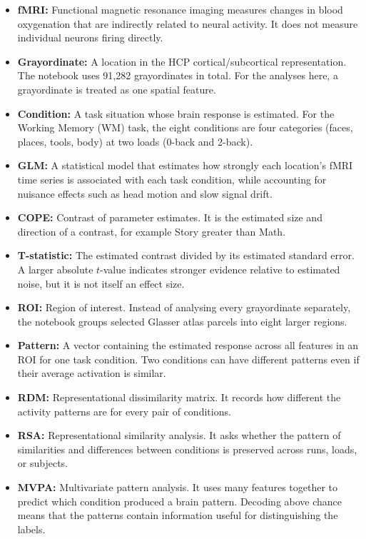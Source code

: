 \documentclass[11pt,a4paper]{article}
\begin{document}
\begin{itemize}
    \item \textbf{fMRI:} Functional magnetic resonance imaging measures changes in blood oxygenation that are indirectly related to neural activity. It does not measure individual neurons firing directly.
    \item \textbf{Grayordinate:} A location in the HCP cortical/subcortical representation. The notebook uses 91,282 grayordinates in total. For the analyses here, a grayordinate is treated as one spatial feature.
    \item \textbf{Condition:} A task situation whose brain response is estimated. For the Working Memory (WM) task, the eight conditions are four categories (faces, places, tools, body) at two loads (0-back and 2-back).
    \item \textbf{GLM:} A statistical model that estimates how strongly each location's fMRI time series is associated with each task condition, while accounting for nuisance effects such as head motion and slow signal drift.
    \item \textbf{COPE:} Contrast of parameter estimates. It is the estimated size and direction of a contrast, for example Story greater than Math.
    \item \textbf{T-statistic:} The estimated contrast divided by its estimated standard error. A larger absolute \(t\)-value indicates stronger evidence relative to estimated noise, but it is not itself an effect size.
    \item \textbf{ROI:} Region of interest. Instead of analysing every grayordinate separately, the notebook groups selected Glasser atlas parcels into eight larger regions.
    \item \textbf{Pattern:} A vector containing the estimated response across all features in an ROI for one task condition. Two conditions can have different patterns even if their average activation is similar.
    \item \textbf{RDM:} Representational dissimilarity matrix. It records how different the activity patterns are for every pair of conditions.
    \item \textbf{RSA:} Representational similarity analysis. It asks whether the pattern of similarities and differences between conditions is preserved across runs, loads, or subjects.
    \item \textbf{MVPA:} Multivariate pattern analysis. It uses many features together to predict which condition produced a brain pattern. Decoding above chance means that the patterns contain information useful for distinguishing the labels.

\end{itemize}
\end{document}
